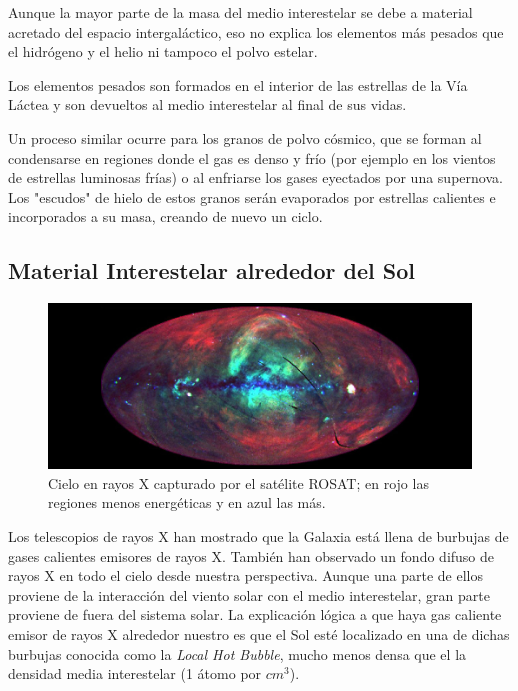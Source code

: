 \documentclass{tufte-handout}
\begin{document}
Aunque la mayor parte de la masa del medio interestelar se debe a material acretado del espacio intergaláctico, eso no explica los elementos más pesados que el hidrógeno y el helio ni tampoco el polvo estelar.

Los elementos pesados son formados en el interior de las estrellas de la Vía Láctea y son devueltos al medio interestelar al final de sus vidas.

Un proceso similar ocurre para los granos de polvo cósmico, que se forman al condensarse en regiones donde el gas es denso y frío (por ejemplo en los vientos de estrellas luminosas frías) o al enfriarse los gases eyectados por una supernova. Los "escudos" de hielo de estos granos serán evaporados por estrellas calientes e incorporados a su masa, creando de nuevo un ciclo.

\subsection{Material Interestelar alrededor del Sol}

\begin{figure}
  \includegraphics[width=\linewidth]{img/xray}
  \caption{Cielo en rayos X capturado por el satélite ROSAT; en rojo las regiones menos energéticas y en azul las más.}
\end{figure}

Los telescopios de rayos X han mostrado que la Galaxia está llena de burbujas de gases calientes emisores de rayos X. También han observado un fondo difuso de rayos X en todo el cielo desde nuestra perspectiva. Aunque una parte de ellos proviene de la interacción del viento solar con el medio interestelar, gran parte proviene de fuera del sistema solar. La explicación lógica a que haya gas caliente emisor de rayos X alrededor nuestro es que el Sol esté localizado en una de dichas burbujas conocida como la \emph{Local Hot Bubble}, mucho menos densa que el la densidad media interestelar (1 átomo por $cm^3$).
\end{document}
